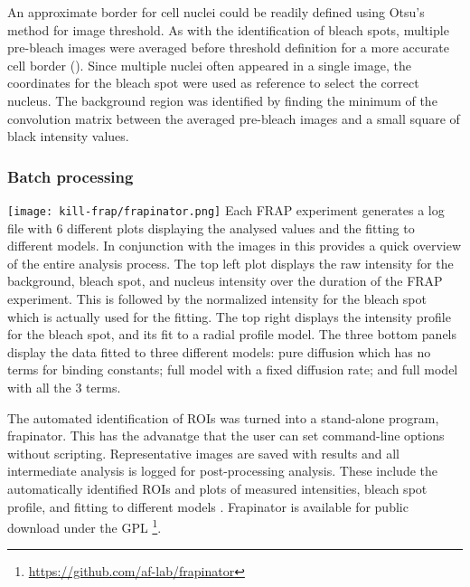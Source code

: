       An approximate border for cell nuclei could be readily defined using Otsu's method for image threshold. 
	  As with the identification of bleach spots, multiple pre-bleach images
      were averaged before threshold definition for a more accurate cell border ().
      Since multiple nuclei often appeared in a single image, the coordinates for the bleach spot 
	  were used as reference to select the correct nucleus. 
	  The background region was identified by finding the minimum of the convolution matrix 
	  between the averaged pre-bleach images and a small square of black intensity values.

    \subsubsection{Batch processing}

      \begin{sidewaysfigure}
        \texttt{[image: kill-frap/frapinator.png]}
          {
            Each FRAP experiment generates a log file with 6 different plots
            displaying the analysed values and the fitting to different models.
            In conjunction with the images in  this
            provides a quick overview of the entire analysis process.
            The top left plot displays the raw intensity
            for the background, bleach spot, and nucleus intensity over the
            duration of the FRAP experiment. This is followed by the normalized
            intensity for the bleach spot which is actually used for the
            fitting. The top right displays the intensity
            profile for the bleach spot, and its fit to a radial profile
            model. The three bottom panels display the data fitted to three
            different models: pure diffusion which has no terms for binding
            constants; full model with a fixed diffusion rate; and full model
            with all the 3 terms.
          }
        \label{fig:kill-frap:frapinator}
      \end{sidewaysfigure}

      The automated identification of ROIs was turned into a stand-alone program, frapinator. 
	  This has the advanatge that the user can set command-line options without scripting. 
	  Representative images are saved with results and all intermediate analysis is logged for post-processing analysis.
      These include the automatically identified ROIs and 
	  plots of measured intensities, bleach spot profile, and fitting to different models .
      Frapinator is available for public download under the GPL \footnote{\url{https://github.com/af-lab/frapinator}}.

